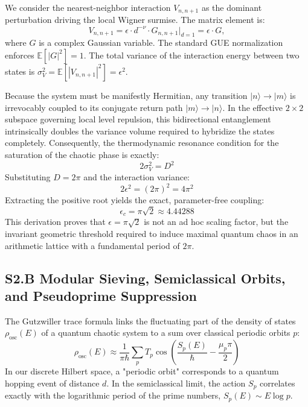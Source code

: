 \documentclass[aps,prl,preprint,superscriptaddress,floatfix]{revtex4-2}
\begin{document}
We consider the nearest-neighbor interaction $V_{n, n+1}$ as the dominant perturbation driving the local Wigner surmise. The matrix element is:
\begin{equation}
V_{n, n+1} = \epsilon \cdot d^{-\nu} \cdot G_{n, n+1} \bigg|_{d=1} = \epsilon \cdot G,
\end{equation}
where $G$ is a complex Gaussian variable. The standard GUE normalization enforces $\mathbb{E}[|G|^2] = 1$. The total variance of the interaction energy between two states is $\sigma_V^2 = \mathbb{E}[|V_{n, n+1}|^2] = \epsilon^2$.

Because the system must be manifestly Hermitian, any transition $|n\rangle \to |m\rangle$ is irrevocably coupled to its conjugate return path $|m\rangle \to |n\rangle$. In the effective $2 \times 2$ subspace governing local level repulsion, this bidirectional entanglement intrinsically doubles the variance volume required to hybridize the states completely. Consequently, the thermodynamic resonance condition for the saturation of the chaotic phase is exactly:
\begin{equation}
2 \sigma_V^2 = D^2
\end{equation}
Substituting $D = 2\pi$ and the interaction variance:
\begin{equation}
2 \epsilon^2 = (2\pi)^2 = 4\pi^2
\end{equation}
Extracting the positive root yields the exact, parameter-free coupling:
\begin{equation}
\epsilon_c = \pi\sqrt{2} \approx 4.44288
\end{equation}
This derivation proves that $\epsilon = \pi\sqrt{2}$ is not an ad hoc scaling factor, but the invariant geometric threshold required to induce maximal quantum chaos in an arithmetic lattice with a fundamental period of $2\pi$.

\subsection{S2.B Modular Sieving, Semiclassical Orbits, and Pseudoprime Suppression}

The Gutzwiller trace formula links the fluctuating part of the density of states $\rho_{\text{osc}}(E)$ of a quantum chaotic system to a sum over classical periodic orbits $p$:
\begin{equation}
\rho_{\text{osc}}(E) \approx \frac{1}{\pi \hbar} \sum_p T_p \cos\left( \frac{S_p(E)}{\hbar} - \frac{\mu_p \pi}{2} \right)
\end{equation}
In our discrete Hilbert space, a "periodic orbit" corresponds to a quantum hopping event of distance $d$. In the semiclassical limit, the action $S_p$ correlates exactly with the logarithmic period of the prime numbers, $S_p(E) \sim E \log p$.
\end{document}
